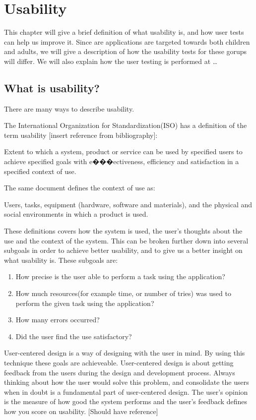 \chapter{Usability}
\label{Usability}

This chapter will give a brief definition of what usability is, and how user tests can help us improve it. Since are applications are targeted towards both children and adults, we will give a description of how the usability tests for these gorups will differ. We will also explain how the user testing is performed at \ldots

\section{What is usability?}
There are many ways to describe usability. 

The International Organization for Standardization(ISO) has a definition of the term usability [insert reference from bibliography]: 

Extent to which a system, product or service can be used by specified
users to achieve specified goals with e���ectiveness, efficiency
and satisfaction in a specified context of use.

The same document defines the context of use as:

Users, tasks, equipment (hardware, software and materials), and
the physical and social environments in which a product is used.

These definitions covers how the system is used, the user's thoughts about the use and the context of the system. This can be broken further down into several subgoals in order to achieve better usability, and to give us a better insight on what usability is. 
These subgoals are:

\begin{enumerate}
\item{How precise is the user able to perform a task using the application?}
\item{How much resources(for example time, or number of tries) was used to perform the given task using the application?}
\item{How many errors occurred?}
\item{Did the user find the use satisfactory?}
\end{enumerate}
User-centered design is a way of designing with the user in mind. By using this technique these goals are achieveable. User-centered design is about getting feedback from the users during the design and development process. Always thinking about how the user would solve this problem, and consolidate the users when in doubt is a fundamental part of user-centered design. The user's opinion is the measure of how good the system performs and the user's feedback defines how you score on usability. [Should have reference]

